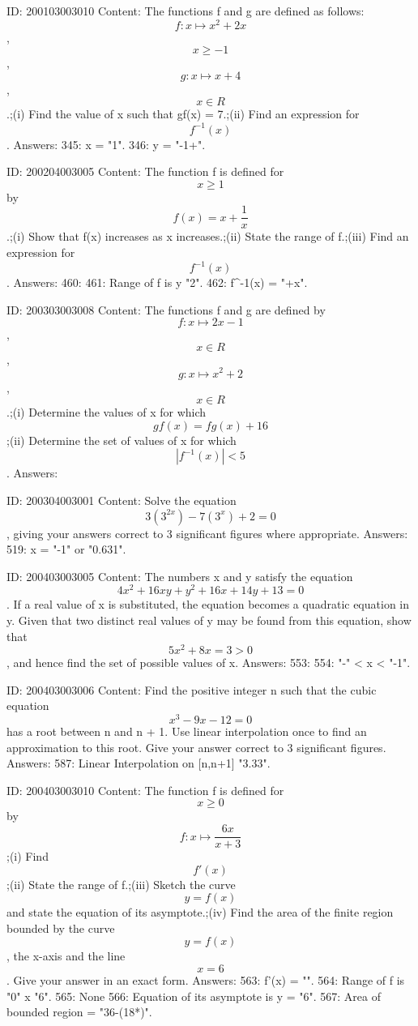 \documentclass{article}
\begin{document}
ID: 200103003010
Content:
The functions f and g are defined as follows:  $$f:x \mapsto x^2  + 2x$$,  $$x \ge  - 1$$,  $$g:x \mapsto x + 4$$,  $$x \in R$$.;(i) Find the value of x such that gf(x) = 7.;(ii) Find an expression for  $$f^{-1}( x )$$. Answers:
345: x = "1".
346: y = "-1+".

ID: 200204003005
Content:
The function f is defined for  $$x \ge 1$$ by  $$f( x ) = x + \frac{1}{x}$$.;(i) Show that f(x) increases as x increases.;(ii) State the range of f.;(iii) Find an expression for  $$f^{-1}( x )$$. Answers:
460: 
461: Range of f is y \geq "2".
462: f^{-1}(x) = "+x".

ID: 200303003008
Content:
The functions f and g are defined by  $$f:x \mapsto 2x - 1$$,  $$x \in R$$,  $$g:x \mapsto x^2  + 2$$,  $$x \in R$$.;(i) Determine the values of x for which $$gf(x) = fg(x) + 16$$;(ii) Determine the set of values of x for which  $$| f^{-1}( x ) | < 5$$. Answers:

ID: 200304003001
Content:
Solve the equation  $$3( 3^{2x} ) - 7( 3^x ) + 2 = 0$$, giving your answers correct to 3 significant figures where appropriate. Answers:
519: x = "-1" or "0.631".

ID: 200403003005
Content:
The numbers x and y satisfy the equation  $$4x^2  + 16xy + y^2  + 16x + 14y + 13 = 0$$. If a real value of x is substituted, the equation becomes a quadratic equation in y. Given that two distinct real values of y may be found from this equation, show that  $$5x^2  + 8x = 3 > 0$$, and hence find the set of possible values of x. Answers:
553: 
554: "-" < x < "-1".

ID: 200403003006
Content:
Find the positive integer n such that the cubic equation  $$x^3  - 9x - 12 = 0$$ has a root between n and n + 1. Use linear interpolation once to find an approximation to this root. Give your answer correct to 3 significant figures.  Answers:
587: Linear Interpolation on [n,n+1] \approx "3.33".

ID: 200403003010
Content:
The function f is defined for $$x \geq  0$$ by $$ f: x \mapsto \frac{6x}{x+3} $$;(i) Find $$f'(x)$$;(ii) State the range of f.;(iii) Sketch the curve $$y = f(x)$$ and state the equation of its asymptote.;(iv) Find the area of the finite region bounded by the curve $$y = f(x)$$, the x-axis and the line $$x = 6$$. Give your answer in an exact form. Answers:
563: f'(x) = "".
564: Range of f is "0" \leq x \leq "6".
565: None
566: Equation of its asymptote is y = "6".
567: Area of bounded region = "36-(18*)".
\end{document}
